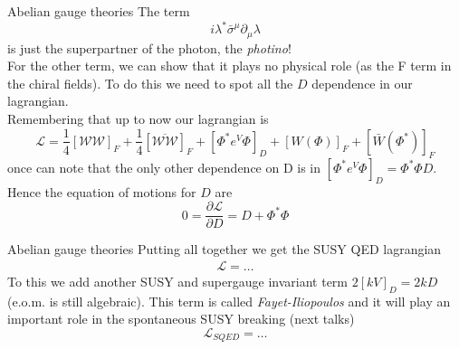 \documentclass[10pt]{beamer}
\begin{document}
\begin{frame}{Abelian gauge theories}
The term 
\begin{equation*}
    i\lambda^* \bar\sigma^{\mu}\partial_{\mu} \lambda
\end{equation*}
is just the superpartner of the photon, the \emph{photino}! \\
For the other term, we can show that it plays no physical role (as the F term in the chiral fields). To do this we need to spot all the $D$ dependence in our lagrangian. \\
Remembering that up to now our lagrangian is 
\begin{equation*}
    \mathcal{L} = \frac{1}{4}\left[\mathcal{WW}\right]_F + \frac{1}{4} \left[\overline{\mathcal{WW}}\right]_F + \left[\Phi^* e^V \Phi\right]_D + [W(\Phi)]_F + [\bar W(\Phi^*)]_F
\end{equation*}
once can note that the only other dependence on D is in $\left[\Phi^* e^V \Phi \right]_D = \Phi^*\Phi D$.
Hence the equation of motions for $D$ are
\begin{equation*}
    0 = \frac{\partial \mathcal{L}}{\partial D} = D + \Phi^* \Phi 
\end{equation*}
\end{frame}

\begin{frame}{Abelian gauge theories}
Putting all together we get the SUSY QED lagrangian 
\begin{gather*}
    \mathcal{L} = \dots
\end{gather*}
To this we add another SUSY and supergauge invariant term $2[kV]_D = 2kD$ (e.o.m. is still algebraic). 
This term is called \emph{Fayet-Iliopoulos} and it will play an important role in the spontaneous SUSY breaking (next talks)
\begin{equation*}
    \boxed{\mathcal{L}_{SQED} = \dots}
\end{equation*}
\end{frame}
\end{document}
